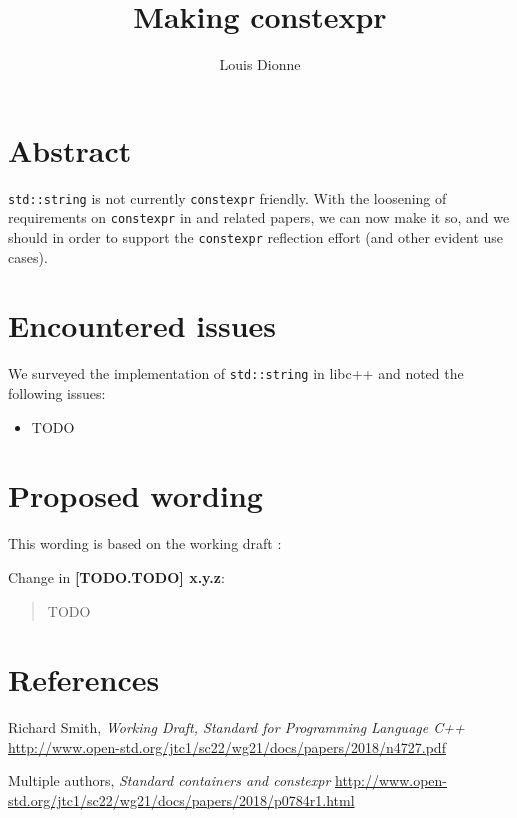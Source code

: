 \documentclass{wg21}
\title{Making \cc{std::string} constexpr}
\author{Louis Dionne}{ldionne.2@gmail.com}
\newcommand{\cc}[1]{\texttt{#1}}
\begin{document}
\maketitle

\section{Abstract}
\cc{std::string} is not currently \cc{constexpr} friendly. With the loosening
of requirements on \cc{constexpr} in \cite{P0784R1} and related papers, we
can now make it so, and we should in order to support the \cc{constexpr}
reflection effort (and other evident use cases).


\section{Encountered issues}
We surveyed the implementation of \cc{std::string} in libc++ and noted the
following issues:
\begin{itemize}
  \item TODO
\end{itemize}


\section{Proposed wording}
This wording is based on the working draft \cite{N4727}:

Change in \textbf{[TODO.TODO] x.y.z}:
\begin{quote}
TODO
\end{quote}


\section{References}
\renewcommand{\section}[2]{}%
\begin{thebibliography}{9}

  Richard Smith,
  \emph{Working Draft, Standard for Programming Language C++}\newline
  \url{http://www.open-std.org/jtc1/sc22/wg21/docs/papers/2018/n4727.pdf}

  Multiple authors,
  \emph{Standard containers and constexpr}\newline
  \url{http://www.open-std.org/jtc1/sc22/wg21/docs/papers/2018/p0784r1.html}

\end{thebibliography}
\end{document}
